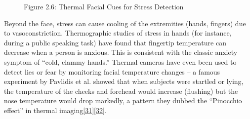 \documentclass[12pt,a4paper]{article}
\begin{document}
\begin{figure}
\centering
{}
\caption{Figure 2.6: Thermal Facial Cues for Stress Detection}
\end{figure}

Beyond the face, stress can cause cooling of the extremities (hands, fingers) due to vasoconstriction. Thermographic studies of stress in hands (for instance, during a public speaking task) have found that fingertip temperature can decrease when a person is anxious. This is consistent with the classic anxiety symptom of ``cold, clammy hands.'' Thermal cameras have even been used to detect lies or fear by monitoring facial temperature changes -- a famous experiment by Pavlidis et al. showed that when subjects were startled or lying, the temperature of the cheeks and forehead would increase (flushing) but the nose temperature would drop markedly, a pattern they dubbed the ``Pinocchio effect'' in thermal imaging\href{https://www.rti.org/rti-press-publication/using-thermal-imaging-measure-mental-effort-nose-know\#:~:text=Using\%20thermal\%20imaging\%20to\%20measure,Temperature\%20change}{{[}31{]}}\href{https://www.nature.com/articles/s41598-019-41172-7\#:~:text=,decreased\%20after\%20the\%20auditory\%20stimulus}{{[}32{]}}.
\end{document}
